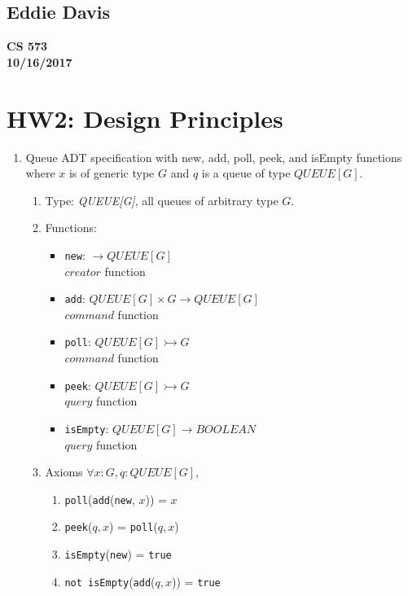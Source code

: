 \documentclass{report}
\begin{document}
\subsection*{Eddie Davis}
\textbf{CS 573}\\
\textbf{10/16/2017}\\

\section*{HW2: Design Principles}

\begin{enumerate}
	\item Queue ADT specification with new, add, poll, peek, and isEmpty functions
	where $x$ is of generic type $G$ and $q$ is a queue of type $QUEUE[G]$.
	
	\begin{enumerate}
		\item Type: \textit{QUEUE[G]}, all queues of arbitrary type $G$.
		\item Functions:
		\begin{itemize}
			\item \texttt{new}: $\rightarrow QUEUE[G]$ \\
			$creator$ function
			\item \texttt{add}: $QUEUE[G] \times G \rightarrow QUEUE[G]$ \\
			$command$ function
			\item \texttt{poll}: $QUEUE[G] \rightarrowtail G$ \\
			$command$ function			
			\item \texttt{peek}: $QUEUE[G] \rightarrowtail G$ \\
    		$query$ function
			\item \texttt{isEmpty}: $QUEUE[G] \rightarrow BOOLEAN$ \\
    		$query$ function			
		\end{itemize}
		
		\item Axioms		
		$\forall x:G, q:QUEUE[G]$,
			\begin{enumerate}
				\item \texttt{poll}(\texttt{add}(\texttt{new}, $x$)) = $x$
				\item \texttt{peek}($q, x$) = \texttt{poll}($q, x$)
				\item \texttt{isEmpty}(\texttt{new}) = \texttt{true}
				\item \texttt{not isEmpty}(\texttt{add}($q, x$)) = \texttt{true}
        	\end{enumerate}		


\end{enumerate}
\end{enumerate}
\end{document}
